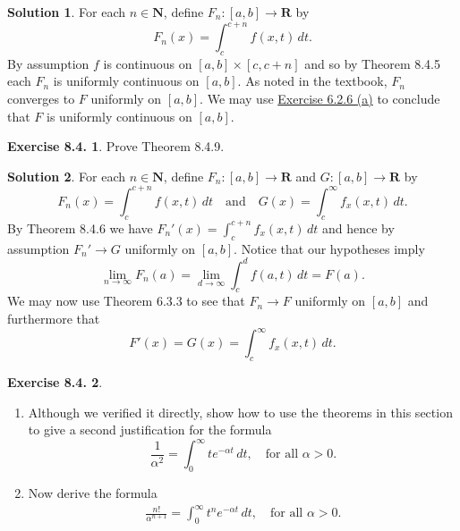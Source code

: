 \documentclass[12pt]{article}
\theoremstyle{definition}
\theoremstyle{exercise}
\newtheorem{exercise}{Exercise 8.4.}
\theoremstyle{solution}
\newtheorem*{solution}{Solution}
\newcommand{\quand}{\quad \text{and} \quad}
\newcommand{\N}{\mathbf{N}}
\newcommand{\R}{\mathbf{R}}
\begin{document}
\begin{solution}
    For each \( n \in \N \), define \( F_n : [a, b] \to \R \) by
    \[
        F_n(x) = \int_c^{c+n} f(x, t) \, dt.
    \]
    By assumption \( f \) is continuous on \( [a, b] \times [c, c+n] \) and so by Theorem 8.4.5 each \( F_n \) is uniformly continuous on \( [a, b] \). As noted in the textbook, \( F_n \) converges to \( F \) uniformly on \( [a, b] \). We may use \href{https://lew98.github.io/Mathematics/UA_Section_6_2_Exercises.pdf}{Exercise 6.2.6 (a)} to conclude that \( F \) is uniformly continuous on \( [a, b] \).
\end{solution}

\begin{exercise}
\label{ex:18}
    Prove Theorem 8.4.9.
\end{exercise}

\begin{solution}
    For each \( n \in \N \), define \( F_n : [a, b] \to \R \) and \( G : [a, b] \to \R \) by
    \[
        F_n(x) = \int_c^{c+n} f(x, t) \, dt \quand G(x) = \int_c^{\infty} f_x(x, t) \, dt.
    \]
    By Theorem 8.4.6 we have \( F_n'(x) = \int_c^{c+n} f_x(x, t) \, dt \) and hence by assumption \( F_n' \to G \) uniformly on \( [a, b] \). Notice that our hypotheses imply
    \[
        \lim_{n \to \infty} F_n(a) = \lim_{d \to \infty} \int_c^d f(a, t) \, dt = F(a).
    \]
    We may now use Theorem 6.3.3 to see that \( F_n \to F \) uniformly on \( [a, b] \) and furthermore that
    \[
        F'(x) = G(x) = \int_c^{\infty} f_x(x, t) \, dt.
    \]
\end{solution}

\begin{exercise}
\label{ex:19}
    \begin{enumerate}
        \item Although we verified it directly, show how to use the theorems in this section to give a second justification for the formula
        \[
            \frac{1}{\alpha^2} = \int_0^{\infty} t e^{-\alpha t} \, dt, \quad \text{for all } \alpha > 0.
        \]

        \item Now derive the formula
        \makeatletter
        \tagsleft@true
        \begin{align*}
            \frac{n!}{\alpha^{n+1}} = \int_0^{\infty} t^n e^{-\alpha t} \, dt, \quad \text{for all } \alpha > 0. \tag{8}
        \end{align*}
        \tagsleft@false
        \makeatother
    \end{enumerate}
\end{exercise}
\end{document}
